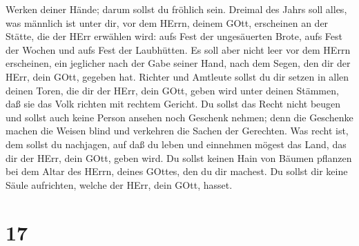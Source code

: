 Werken deiner Hände; darum sollst du fröhlich sein. 
Dreimal des Jahrs soll alles, was männlich ist unter dir, vor dem HErrn,
deinem GOtt, erscheinen an der Stätte, die der HErr erwählen wird: aufs
Fest der ungesäuerten Brote, aufs Fest der Wochen und aufs Fest der
Laubhütten. Es soll aber nicht leer vor dem HErrn erscheinen,
 ein jeglicher nach der Gabe seiner Hand, nach dem Segen,
den dir der HErr, dein GOtt, gegeben hat.  Richter und
Amtleute sollst du dir setzen in allen deinen Toren, die dir der HErr,
dein GOtt, geben wird unter deinen Stämmen, daß sie das Volk richten mit
rechtem Gericht.  Du sollst das Recht nicht beugen und
sollst auch keine Person ansehen noch Geschenk nehmen; denn die
Geschenke machen die Weisen blind und verkehren die Sachen der
Gerechten.  Was recht ist, dem sollst du nachjagen, auf daß
du leben und einnehmen mögest das Land, das dir der HErr, dein GOtt,
geben wird.  Du sollst keinen Hain von Bäumen pflanzen bei
dem Altar des HErrn, deines GOttes, den du dir machest.  Du
sollst dir keine Säule aufrichten, welche der HErr, dein GOtt, hasset.

\hypertarget{section-16}{%
\section{17}\label{section-16}}

